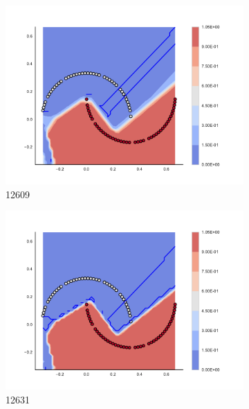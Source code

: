 \begin{figure}[h]
\begin{subfigure}[b]{0.09\textwidth}
    \includegraphics[clip, trim=2.35cm 1.75cm 4.5cm 0cm,width=\textwidth]{img/convergence/12609.pdf}
    \caption{12609}
    \label{fig:convergence_12609}
\end{subfigure}
%
\begin{subfigure}[b]{0.09\textwidth}
    \includegraphics[clip, trim=2.35cm 1.75cm 4.5cm 0cm,width=\textwidth]{img/convergence/12631.pdf}
    \caption{12631}
    \label{fig:convergence_12631}
\end{subfigure}
%
\begin{subfigure}[b]{0.09\textwidth}

\end{subfigure}
\end{figure}
